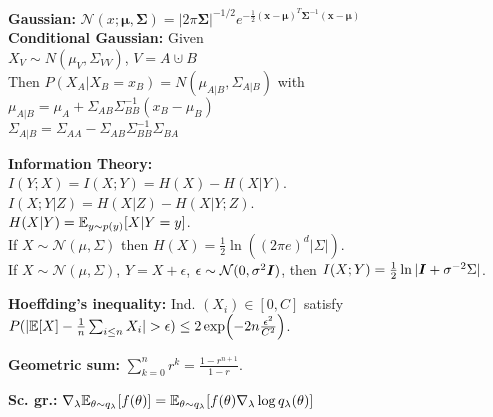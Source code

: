 \textbf{Gaussian:}
$\mathcal{N}(x;\bm{\mu}, \bm{\Sigma})= |2\pi\bm{\Sigma}|^{-1/2} e^{-\frac{1}{2}(\mathbf{x}-\bm{\mu})^T\bm{\Sigma}^{-1}(\mathbf{x}-\bm{\mu})} $\\
\textbf{Conditional Gaussian:}
Given\\$X_V \sim N(\mu_V, \Sigma_{VV})$, $V=A\cupdot B$\\
Then $P(X_A|X_B=x_B)=N(\mu_{A|B}, \Sigma_{A|B})$ with\\
$\mu_{A|B}=\mu_A+\Sigma_{AB}\Sigma^{-1}_{BB}(x_B-\mu_B)$\\
$\Sigma_{A|B}=\Sigma_{AA}-\Sigma_{AB}\Sigma^{-1}_{BB}\Sigma_{BA}$

\textbf{Information Theory:}\\
$I(Y;X) = I(X;Y) = H(X) - H(X|Y)$.\\
$I(X;Y|Z) = H(X|Z) - H(X|Y;Z)$.\\
$H(X|Y) = \mathbb{E}_{y\sim p(y)}[X|Y=y]$.\\
If $X\sim\mathcal{N}(\mu, \Sigma)$ then $H(X) = \frac{1}{2}\ln((2\pi e)^d|\Sigma|)$.\\
If $X\sim\mathcal{N}(\mu, \Sigma)$, $Y = X + \epsilon$, $\epsilon\sim\mathcal{N}(0,\sigma^2{\bm{I}})$, then $I(X;Y) = \frac{1}{2}\ln|{\bm{I}}+\sigma^{-2}\Sigma|$.

\textbf{Hoeffding's inequality:}
Ind. $(X_i)\in[0,C]$ satisfy $P(|\E[X] - \frac{1}{n}\sum_{i\leq n}X_i|>\epsilon) \leq 2\exp(-2n\frac{\epsilon^2}{C^2})$.

\textbf{Geometric sum:} $\sum_{k=0}^{n}r^k = \frac{1-r^{n+1}}{1-r}$.

\textbf{Sc. gr.:} $\nabla_\lambda \mathbb{E}_{\theta\sim q_\lambda}[f(\theta)] = \mathbb{E}_{\theta\sim q_\lambda}[f(\theta)\nabla_\lambda \log q_\lambda(\theta)]$

